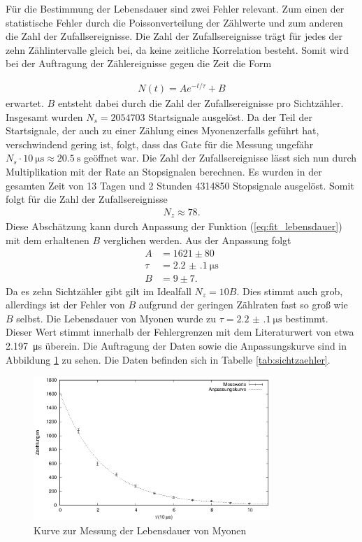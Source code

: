 Für die Bestimmung der Lebensdauer sind zwei Fehler relevant. Zum einen der statistische Fehler durch die Poissonverteilung der Zählwerte und zum anderen die Zahl der Zufallsereignisse. Die Zahl der Zufallsereignisse trägt für jedes der zehn Zählintervalle gleich bei, da keine zeitliche Korrelation besteht. Somit wird bei der Auftragung der Zählereignisse gegen die Zeit die Form

\begin{align}
  N(t)=A e^{-t/\tau}+B
  \label{eq:fit_lebensdauer}
\end{align}
 erwartet. $B$ entsteht dabei durch die Zahl der Zufallsereignisse pro Sichtzähler.
Insgesamt wurden $N_s=2054703$ Startsignale ausgelöst. Da der Teil der Startsignale, der auch zu einer Zählung eines Myonenzerfalls geführt hat, verschwindend gering ist, folgt, dass das Gate für die Messung ungefähr $N_s \cdot \SI{10}{\micro\second}\approx\SI{20.5}{\second}$ geöffnet war. Die Zahl der Zufallsereignisse lässt sich nun durch Multiplikation mit der Rate an Stopsignalen berechnen. Es wurden in der gesamten Zeit von 13 Tagen und 2 Stunden 4314850 Stopsignale ausgelöst. Somit folgt für die Zahl der Zufallsereignisse 
\begin{align*}
  N_z\approx 78.
\end{align*}
Diese Abschätzung kann durch Anpassung der Funktion (\ref{eq:fit_lebensdauer}) mit dem erhaltenen $B$ verglichen werden. Aus der Anpassung folgt
\begin{align*}
  A&=1621 \pm 80\\
  \tau&=\SI[separate-uncertainty = true]{2.2(1)}{\micro\second}\\
  B&=9 \pm 7.
\end{align*}
Da es zehn Sichtzähler gibt gilt im Idealfall $N_z=10B$. Dies stimmt auch grob, allerdings ist der Fehler von $B$ aufgrund der geringen Zählraten fast so groß wie $B$ selbst. Die Lebensdauer von Myonen wurde zu $\tau = \SI[separate-uncertainty = true]{2.2(1)}{\micro\second}$ bestimmt. Dieser Wert stimmt innerhalb der Fehlergrenzen mit dem Literaturwert von etwa \SI{2.197}{\micro\second}\cite{pdg} überein. Die Auftragung der Daten sowie die Anpassungskurve sind in Abbildung \ref{fig:lebensdauer} zu sehen. Die Daten befinden sich in Tabelle \ref{tab:sichtzaehler}.

\begin{figure}[h]
  \centering
  \includegraphics[width=0.8\textwidth]{./data/lebensdauer.eps}
  \caption{Kurve zur Messung der Lebensdauer von Myonen}
  \label{fig:lebensdauer}
\end{figure}



